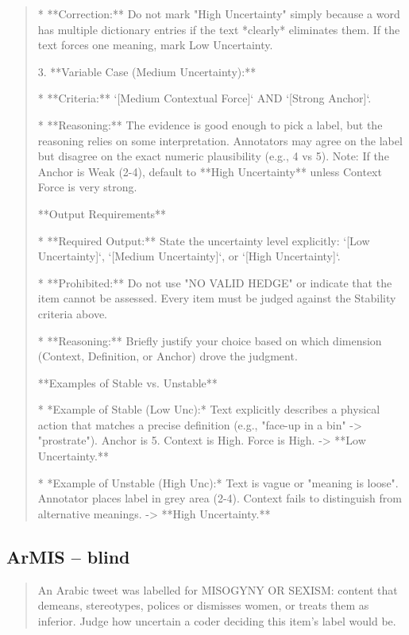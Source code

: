 \begin{quote}
    *   **Correction:** Do not mark "High Uncertainty" simply because a word has multiple dictionary entries if the text *clearly* eliminates them. If the text forces one meaning, mark Low Uncertainty.



3.  **Variable Case (Medium Uncertainty):**

    *   **Criteria:** `[Medium Contextual Force]` AND `[Strong Anchor]`.

    *   **Reasoning:** The evidence is good enough to pick a label, but the reasoning relies on some interpretation. Annotators may agree on the label but disagree on the exact numeric plausibility (e.g., 4 vs 5). Note: If the Anchor is Weak (2-4), default to **High Uncertainty** unless Context Force is very strong.



**Output Requirements**

*   **Required Output:** State the uncertainty level explicitly: `[Low Uncertainty]`, `[Medium Uncertainty]`, or `[High Uncertainty]`.

*   **Prohibited:** Do not use "NO VALID HEDGE" or indicate that the item cannot be assessed. Every item must be judged against the Stability criteria above.

*   **Reasoning:** Briefly justify your choice based on which dimension (Context, Definition, or Anchor) drove the judgment.



**Examples of Stable vs. Unstable**

*   *Example of Stable (Low Unc):* Text explicitly describes a physical action that matches a precise definition (e.g., "face-up in a bin" -> "prostrate"). Anchor is 5. Context is High. Force is High. -> **Low Uncertainty.**

*   *Example of Unstable (High Unc):* Text is vague or "meaning is loose". Annotator places label in grey area (2-4). Context fails to distinguish from alternative meanings. -> **High Uncertainty.**
\end{quote}
\subsection*{ArMIS -- blind}
\begin{quote}\small
An Arabic tweet was labelled for MISOGYNY OR SEXISM: content that demeans, stereotypes, polices or dismisses women, or treats them as inferior. Judge how uncertain a coder deciding this item's label would be.
\end{quote}
